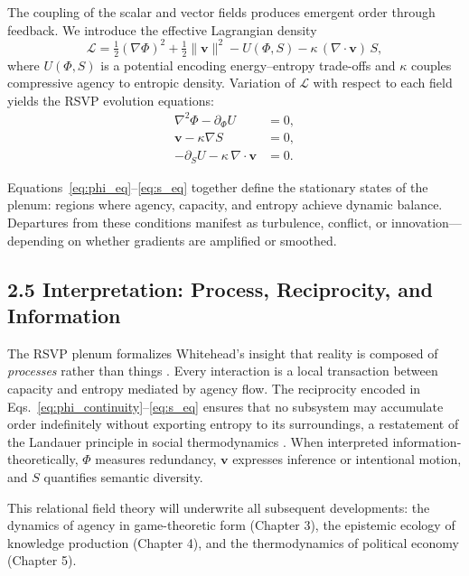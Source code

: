 \documentclass[11pt,a4paper,titlepage]{article}
\theoremstyle{definition}
\begin{document}
The coupling of the scalar and vector fields produces emergent order through
feedback.  We introduce the effective Lagrangian density
\begin{equation}
\mathcal{L} = 
  \tfrac{1}{2}(\nabla\Phi)^2 
  + \tfrac{1}{2}\|\mathbf{v}\|^2 
  - U(\Phi,S)
  - \kappa\,(\nabla\!\cdot\mathbf{v})\,S,
\label{eq:lagrangian}
\end{equation}
where $U(\Phi,S)$ is a potential encoding energy–entropy trade-offs and
$\kappa$ couples compressive agency to entropic density.
Variation of $\mathcal{L}$ with respect to each field yields the RSVP
evolution equations:
\begin{align}
\nabla^2\Phi - \partial_\Phi U &= 0, \label{eq:phi_eq}\\
\mathbf{v} - \kappa\nabla S &= 0, \label{eq:v_eq}\\
-\partial_S U - \kappa\,\nabla\!\cdot\mathbf{v} &= 0. \label{eq:s_eq}
\end{align}

Equations~\eqref{eq:phi_eq}–\eqref{eq:s_eq} together define the stationary
states of the plenum: regions where agency, capacity, and entropy achieve
dynamic balance.  Departures from these conditions manifest as turbulence,
conflict, or innovation—depending on whether gradients are amplified or
smoothed.

\subsection{2.5 Interpretation: Process, Reciprocity, and Information}

The RSVP plenum formalizes Whitehead’s insight that reality is composed of
\emph{processes} rather than things \cite{whitehead1929}.
Every interaction is a local transaction between capacity and entropy mediated
by agency flow.  The reciprocity encoded in
Eqs.~\eqref{eq:phi_continuity}–\eqref{eq:s_eq} ensures that no subsystem may
accumulate order indefinitely without exporting entropy to its surroundings,
a restatement of the Landauer principle in social thermodynamics
\cite{landauer1961,baez2022}.
When interpreted information-theoretically, $\Phi$ measures redundancy,
$\mathbf{v}$ expresses inference or intentional motion, and $S$ quantifies
semantic diversity.

This relational field theory will underwrite all subsequent developments:
the dynamics of agency in game-theoretic form (Chapter 3),
the epistemic ecology of knowledge production (Chapter 4),
and the thermodynamics of political economy (Chapter 5).
\end{document}
